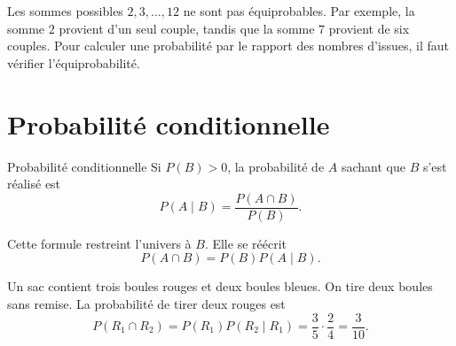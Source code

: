 \begin{warningbox}
Les sommes possibles $2,3,\ldots,12$ ne sont pas équiprobables. Par exemple, la somme $2$ provient d'un seul couple, tandis que la somme $7$ provient de six couples. Pour calculer une probabilité par le rapport des nombres d'issues, il faut vérifier l'équiprobabilité.
\end{warningbox}

\section{Probabilité conditionnelle}
\label{manual:section:08.03}

\begin{definition}{Probabilité conditionnelle}{}
Si $P(B)>0$, la probabilité de $A$ sachant que $B$ s'est réalisé est
\[
P(A\mid B)=\frac{P(A\cap B)}{P(B)}.
\]
\end{definition}

Cette formule restreint l'univers à $B$. Elle se réécrit
\[
P(A\cap B)=P(B)P(A\mid B).
\]

\begin{examplebox}
Un sac contient trois boules rouges et deux boules bleues. On tire deux boules sans remise. La probabilité de tirer deux rouges est
\[
P(R_1\cap R_2)=P(R_1)P(R_2\mid R_1)=\frac35\cdot\frac24=\frac3{10}.
\]
\end{examplebox}

\begin{center}
\end{center}


